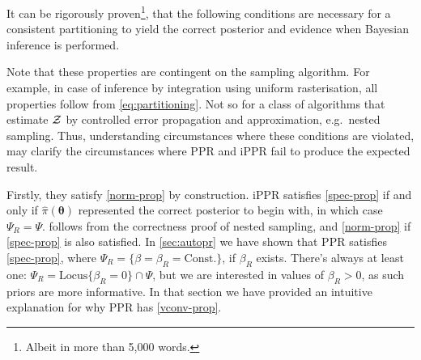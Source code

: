 \documentclass[usenatbib]{mnras}
\begin{document}
It can be rigorously proven\footnote{Albeit in more than 5,000
  words.}, that the following conditions are necessary for a
consistent partitioning to yield the correct posterior and evidence
when Bayesian inference is performed.
Note that these properties are contingent on the sampling
algorithm. For example, in case of inference by integration using
uniform rasterisation, all properties follow from
\cref{eq:partitioning}. Not so for a class of algorithms that estimate
${\cal Z}$ by controlled error propagation and approximation,
e.g.~nested sampling. Thus, understanding circumstances where these
conditions are violated, may clarify the circumstances where PPR and
iPPR fail to produce the expected result.

Firstly, they satisfy \cref{norm-prop} by construction. iPPR satisfies
\cref{spec-prop} if and only if \( \hat{\pi} (\bm{\theta})\)
represented the correct posterior to begin with, in which case
$\Psi_{R} = \Psi$.  follows from the correctness
proof of nested sampling, \citep{Skilling2006} and \cref{norm-prop} if
\cref{spec-prop} is also satisfied. In \cref{sec:autopr} we have shown
that PPR satisfies \cref{spec-prop}, where
$\Psi_{R} = \{ \beta = \beta_{R} = \text{Const.}\}$, if $\beta_{R}$
exists. There's always at least one:
$\Psi_{R} = \text{Locus}\{ \beta_{R}=0 \} \cap \Psi$, but we are
interested in values of $\beta_{R} > 0$, as such priors are more
informative. In that section we have provided an intuitive explanation
for why PPR has \cref{vconv-prop}.
\end{document}
